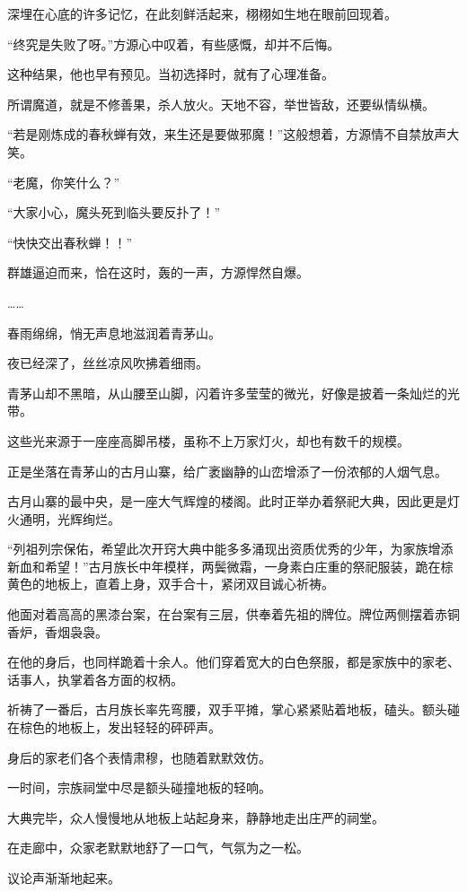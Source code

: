 \begin{this_body}
深埋在心底的许多记忆，在此刻鲜活起来，栩栩如生地在眼前回现着。

“终究是失败了呀。”方源心中叹着，有些感慨，却并不后悔。

这种结果，他也早有预见。当初选择时，就有了心理准备。

所谓魔道，就是不修善果，杀人放火。天地不容，举世皆敌，还要纵情纵横。

“若是刚炼成的春秋蝉有效，来生还是要做邪魔！”这般想着，方源情不自禁放声大笑。

“老魔，你笑什么？”

“大家小心，魔头死到临头要反扑了！”

“快快交出春秋蝉！！”

群雄逼迫而来，恰在这时，轰的一声，方源悍然自爆。

……

春雨绵绵，悄无声息地滋润着青茅山。

夜已经深了，丝丝凉风吹拂着细雨。

青茅山却不黑暗，从山腰至山脚，闪着许多莹莹的微光，好像是披着一条灿烂的光带。

这些光来源于一座座高脚吊楼，虽称不上万家灯火，却也有数千的规模。

正是坐落在青茅山的古月山寨，给广袤幽静的山峦增添了一份浓郁的人烟气息。

古月山寨的最中央，是一座大气辉煌的楼阁。此时正举办着祭祀大典，因此更是灯火通明，光辉绚烂。

“列祖列宗保佑，希望此次开窍大典中能多多涌现出资质优秀的少年，为家族增添新血和希望！”古月族长中年模样，两鬓微霜，一身素白庄重的祭祀服装，跪在棕黄色的地板上，直着上身，双手合十，紧闭双目诚心祈祷。

他面对着高高的黑漆台案，在台案有三层，供奉着先祖的牌位。牌位两侧摆着赤铜香炉，香烟袅袅。

在他的身后，也同样跪着十余人。他们穿着宽大的白色祭服，都是家族中的家老、话事人，执掌着各方面的权柄。

祈祷了一番后，古月族长率先弯腰，双手平摊，掌心紧紧贴着地板，磕头。额头碰在棕色的地板上，发出轻轻的砰砰声。

身后的家老们各个表情肃穆，也随着默默效仿。

一时间，宗族祠堂中尽是额头碰撞地板的轻响。

大典完毕，众人慢慢地从地板上站起身来，静静地走出庄严的祠堂。

在走廊中，众家老默默地舒了一口气，气氛为之一松。

议论声渐渐地起来。


\end{this_body}
